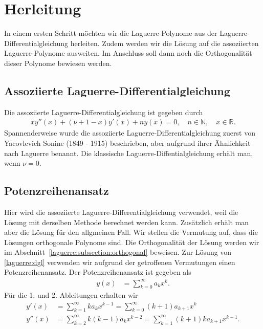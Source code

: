 %
%
%
\section{Herleitung%
  \label{laguerre:section:definition}}
%
In einem ersten Schritt möchten wir die Laguerre-Polynome
aus der Laguerre-\-Differentialgleichung herleiten.
Zudem werden wir die Lösung auf die assoziierten Laguerre-Polynome ausweiten.
Im Anschluss soll dann noch die Orthogonalität dieser Polynome bewiesen werden.

\subsection{Assoziierte Laguerre-Differentialgleichung}
Die assoziierte Laguerre-Differentialgleichung ist gegeben durch
\begin{align}
x y''(x) + (\nu + 1 - x) y'(x) + n y(x)
=
0
, \quad
n \in \mathbb{N}
, \quad
x \in \mathbb{R}
\label{laguerre:dgl}
.
\end{align}
Spannenderweise wurde die assoziierte Laguerre-Differentialgleichung
zuerst von Yacovlevich Sonine (1849 - 1915) beschrieben,
aber aufgrund ihrer Ähnlichkeit nach Laguerre benannt.
Die klassische Laguerre-Diffentialgleichung erhält man, wenn $\nu = 0$.

\subsection{Potenzreihenansatz%
\label{laguerre:subsection:potenzreihenansatz}}
Hier wird die assoziierte Laguerre-Differentialgleichung verwendet,
weil die Lösung mit derselben Methode berechnet werden kann.
Zusätzlich erhält man aber die Lösung für den allgmeinen Fall.
Wir stellen die Vermutung auf,
dass die Lösungen orthogonale Polynome sind.
Die Orthogonalität der Lösung werden wir im
Abschnitt~\ref{laguerre:subsection:orthogonal} beweisen.
Zur Lösung von \eqref{laguerre:dgl} verwenden wir aufgrund
der getroffenen Vermutungen einen Potenzreihenansatz.
Der Potenzreihenansatz ist gegeben als
\begin{align*}
y(x)
 & =
\sum_{k=0}^\infty a_k x^k
.
\end{align*}
Für die 1. und 2. Ableitungen erhalten wir
\begin{align*}
y'(x)
 & =
\sum_{k=1}^\infty k a_k x^{k-1}
=
\sum_{k=0}^\infty (k+1) a_{k+1} x^k
\\
y''(x)
 & =
\sum_{k=2}^\infty k (k-1) a_k x^{k-2}
=
\sum_{k=1}^\infty (k+1) k a_{k+1} x^{k-1}
.
\end{align*}

